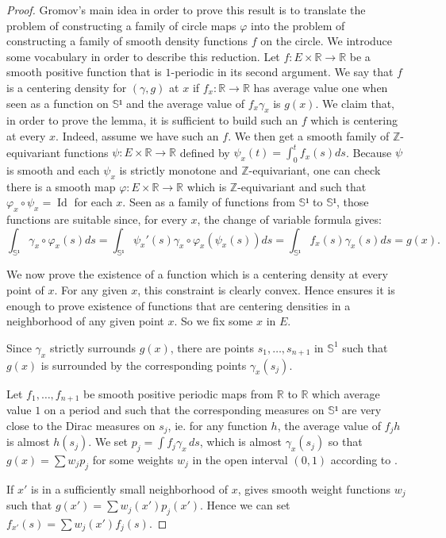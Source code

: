 \documentclass[10pt,a4paper]{article}
\newcommand{\co}{\!:}
\DeclareMathOperator{\Id}{Id}
\newcommand{\uses}[1]{}
\newcommand{\leanok}{}
\begin{document}
\begin{proof}
  \uses{lem:smooth_barycentric_coord, lem:exists_cont_diff_of_convex₂}
  \leanok
  Gromov's main idea in order to prove this result is to translate the problem
  of constructing a family of circle maps $φ$ into the problem of constructing
  a family of smooth density functions $f$ on the circle. We introduce some
  vocabulary in order to describe this reduction.
  Let $f \co E × ℝ → ℝ$ be a smooth positive function that is $1$-periodic in
  its second argument.
  We say that $f$ is a centering density for $(γ, g)$ at $x$ if
  $f_x \co ℝ → ℝ$ has average value one when seen as a function on $𝕊¹$ and
  the average value of $f_x γ_x$ is $g(x)$. We claim that, in order to prove
  the lemma, it is sufficient to build such an $f$ which is centering at every
  $x$. Indeed, assume we have such an $f$. We then get a smooth family
  of $ℤ$-equivariant functions $ψ \co E × ℝ → ℝ$ defined by
  $ψ_x(t) = \int_0^tf_x(s)ds$. Because $ψ$ is smooth and each $ψ_x$ is strictly
  monotone and $ℤ$-equivariant, one can check there is a smooth map
  $φ : E × ℝ → ℝ$ which is $ℤ$-equivariant and such that $φ_x ∘ ψ_x = \Id$ for
  each $x$. Seen as a family of functions from $𝕊¹$ to $𝕊¹$, those functions
  are suitable since, for every $x$, the change of variable formula gives:
  \[
    \int_{𝕊¹} γ_x ∘ φ_x(s)ds = \int_{𝕊¹} ψ_x'(s) γ_x ∘ φ_x(ψ_x(s))ds
     = \int_{𝕊¹} f_x(s) γ_x(s)ds = g(x).
  \]

  We now prove the existence of a function which is a centering density at every point of $x$.
  For any given $x$, this constraint is clearly convex.
  Hence  ensures it is enough to prove existence
  of functions that are centering densities in a neighborhood of any given point $x$.
  So we fix some $x$ in $E$.

  Since $γ_x$ strictly surrounds $g(x)$, there are points
  $s_1, …, s_{n+1}$ in $𝕊^1$ such that $g(x)$ is surrounded
  by the corresponding points $γ_x(s_j)$.


  Let $f_1, …, f_{n+1}$ be smooth positive periodic maps from $ℝ$ to $ℝ$
  which average value $1$ on a period and such that the corresponding measures
  on $𝕊¹$ are very
  close to the Dirac measures on $s_j$, ie. for any function $h$, the average value of
  $f_jh$ is almost $h(s_j)$. We set $p_j = \int f_jγ_x\, ds$, which
  is almost $γ_x(s_j)$ so that $g(x) = \sum w_j p_j$ for some weights
  $w_j$ in the open interval $(0, 1)$ according to
  .

  If $x'$ is in a sufficiently small neighborhood of $x$,
   gives smooth weight functions $w_j$
  such that $g(x') = \sum w_j(x')p_j(x')$. Hence we can set
  $f_{x'}(s) = \sum w_j(x')f_j(s)$.
\end{proof}
\end{document}

